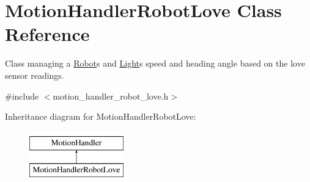 \hypertarget{class_motion_handler_robot_love}{}\section{Motion\+Handler\+Robot\+Love Class Reference}
\label{class_motion_handler_robot_love}


Class managing a \mbox{\hyperlink{class_robot}{Robot}}\textquotesingle{}s and \mbox{\hyperlink{class_light}{Light}}\textquotesingle{}s speed and heading angle based on the love sensor readings.  




{\ttfamily \#include $<$motion\+\_\+handler\+\_\+robot\+\_\+love.\+h$>$}

Inheritance diagram for Motion\+Handler\+Robot\+Love\+:\begin{figure}[H]
\begin{center}
\leavevmode
\includegraphics[height=2.000000cm]{class_motion_handler_robot_love}
\end{center}
\end{figure}
